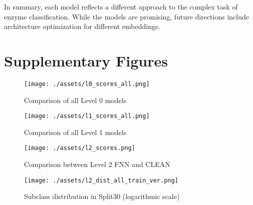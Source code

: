 \documentclass{bioinfo}
\begin{document}
In summary, each model reflects a different approach to the complex task of enzyme classification.
While the models are promising, future directions include architecture optimization for different embeddings.




\section{Supplementary Figures}\label{sec:supplementary figures}
\begin{figure}[!ht]
	\texttt{[image: ./assets/l0\_scores\_all.png]}
	\caption{Comparison of all Level 0 models}
	\label{fig:l0_comp_all}
\end{figure}

\begin{figure}[!ht]
	\texttt{[image: ./assets/l1\_scores\_all.png]}
	\caption{Comparison of all Level 1 models}
	\label{fig:l1_comp_all}
\end{figure}

\begin{figure}[!ht]
	\texttt{[image: ./assets/l2\_scores.png]}
	\caption{Comparison between Level 2 FNN and CLEAN}
	\label{fig:FNN_scores_l2}
\end{figure}
\begin{figure}[!ht]
\texttt{[image: ./assets/l2\_dist\_all\_train\_ver.png]}
\caption{Subclass distribution in Split30 (logarithmic scale)}\label{fig:l2_dist_train}
\end{figure}

\cleardoublepage
 

\end{document}
